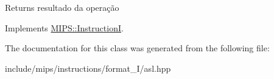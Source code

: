 \begin{DoxyReturn}{Returns}
resultado da operação 
\end{DoxyReturn}


Implements \hyperlink{classMIPS_1_1InstructionI_ae60fca5801bf5415cdff06d2aa11764f}{M\+I\+P\+S\+::\+InstructionI}.



The documentation for this class was generated from the following file\+:\begin{DoxyCompactItemize}
\item 
include/mips/instructions/format\+\_\+\+I/asl.\+hpp\end{DoxyCompactItemize}
